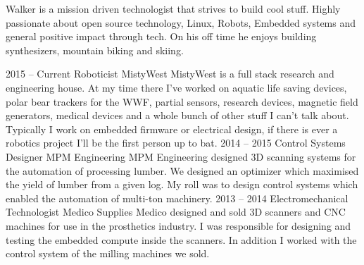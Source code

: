 \documentclass[9pt]{developercv} %
\begin{document}
\begin{minipage}[t]{0.4\textwidth} %
	\vspace{-\baselineskip} %
  Walker is a mission driven technologist that strives to build cool stuff. Highly
  passionate about open source technology, Linux, Robots, Embedded systems and general positive impact through tech. On his off time he enjoys building synthesizers, mountain biking and skiing.  
\end{minipage}
\hfill %
\begin{minipage}[t]{0.5\textwidth} %
	\vspace{-\baselineskip} %
	\begin{barchart}{5.5}
	\end{barchart}
\end{minipage}


\begin{entrylist}
	\entry
		{2015 -- Current}
		{Roboticist}
		{MistyWest}
		{MistyWest is a full stack research and engineering house. At my time there I've worked on aquatic life saving devices, polar bear trackers for the WWF, partial sensors, research devices, magnetic field generators, medical devices and a whole bunch of other stuff I can't talk about. Typically I work on embedded firmware or electrical design, if there is ever a robotics project I'll be the first person up to bat.}
	\entry
		{2014 -- 2015}
		{Control Systems Designer}
		{MPM Engineering}
		{MPM Engineering designed 3D scanning systems for the automation of processing lumber. We designed an optimizer which maximised the yield of lumber from a given log. My roll was to design control systems which enabled the automation of multi-ton machinery.}
	\entry
		{2013 -- 2014}
		{Electromechanical Technologist}
		{Medico Supplies}
		{Medico designed and sold 3D scanners and CNC machines for use in the prosthetics industry. I was responsible for designing and testing the embedded compute inside the scanners. In addition I worked with the control system of the milling machines we sold.}
\end{entrylist}
\end{document}
